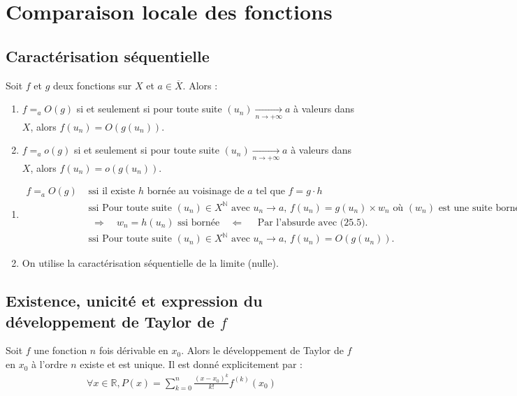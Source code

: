 \documentclass[../main.tex]{subfiles}
\begin{document}
\setcounter{chapter}{24}
\chapter{Comparaison locale des fonctions}
\tableofcontents
\clearpage

\section{Caractérisation séquentielle}
\begin{tcolorbox}[title=Théorème 25.6, title filled=false, colframe=orange, colback=orange!10!white]
    Soit $f$ et $g$ deux fonctions sur $X$ et $a\in \overline{X}$. Alors : 
    \begin{enumerate}
        \item $f =_a O(g)$ si et seulement si pour toute suite $(u_n) \underset{n \to +\infty}{\longrightarrow} a$ à valeurs dans $X$, alors $f(u_n) = O(g(u_n))$. 
        \item $f =_a o(g)$ si et seulement si pour toute suite $(u_n) \underset{n \to +\infty}{\longrightarrow} a$ à valeurs dans $X$, alors $f(u_n) = o(g(u_n))$.
    \end{enumerate}
\end{tcolorbox}

\begin{enumerate}
    \item \begin{align*}
        f =_a O(g) &\text{ ssi } \text{il existe $h$ bornée au voisinage de $a$ tel que } f = g \cdot h \\
        &\text{ ssi } \text{Pour toute suite $(u_n) \in X^{\mathbb{N}}$ avec $u_n\to a$, } f(u_n) = g(u_n) \times w_n \text{ où $(w_n)$ est une suite bornée. } \\
        &\text{ } \boxed{\Rightarrow} \quad w_n = h(u_n) \text{ ssi bornée} \quad \boxed{\Leftarrow} \quad \text{ Par l'absurde avec (25.5). } \\
        &\text{ ssi } \text{Pour toute suite $(u_n) \in X^{\mathbb{N}}$ avec $u_n\to a$, } f(u_n) = O(g(u_n)).
    \end{align*}
    \item On utilise la caractérisation séquentielle de la limite (nulle). 
\end{enumerate}

\section{Existence, unicité et expression du développement de Taylor de $f$}
\begin{tcolorbox}[title=Théorème 25.14, title filled=false, colframe=orange, colback=orange!10!white]
    Soit $f$ une fonction $n$ fois dérivable en $x_0$. Alors le développement de Taylor de $f$ en $x_0$ à l'ordre $n$ existe et est unique. Il est donné explicitement par :
    \begin{align*}
        \forall x\in \mathbb{R}, P(x) = \sum_{k=0}^{n} \frac{(x-x_0)^k}{k!} f^{(k)}(x_0)
    \end{align*}
\end{tcolorbox}
\end{document}
